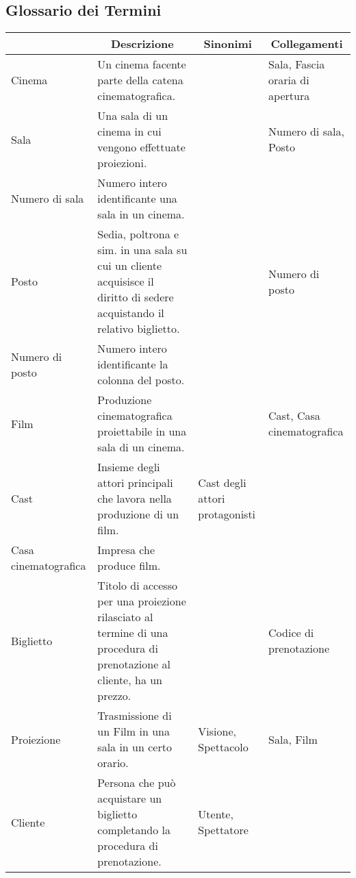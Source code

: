\subsection*{Glossario dei Termini}
%
%
\begin{longtable}{|p{3.86cm}|p{3.86cm}|p{3.86cm}|p{3.86cm}|}
    \hline
    \rowcolor{tblhdrcolor}
    \multicolumn{1}{|c|}{\textbf{Termine}}
     & \multicolumn{1}{|c|}{\textbf{Descrizione}}
     & \multicolumn{1}{|c|}{\textbf{Sinonimi}}
     & \multicolumn{1}{|c|}{\textbf{Collegamenti}}
    \\\hline
    Cinema
     & Un cinema facente parte della catena cinematografica.
     &
     & Sala, Fascia oraria di apertura
    \\\hline
    Sala
     & Una sala di un cinema in cui vengono effettuate proiezioni.
     &
     & Numero di sala, Posto
    \\\hline
    Numero di sala
     & Numero intero identificante una sala in un cinema.
     &
     &
    \\\hline
    Posto
     & Sedia, poltrona e sim. in una sala su cui un cliente acquisisce
    il diritto di sedere acquistando il relativo biglietto.
     &
     & Numero di posto
    \\\hline
    Numero di posto
     & Numero intero identificante la colonna del posto.
     &
     &
    \\\hline
    Film
     & Produzione cinematografica proiettabile in una sala di un cinema.
     &
     & Cast, Casa cinematografica
    \\\hline
    Cast
     & Insieme degli attori principali che lavora nella produzione di un film.
     & Cast degli attori protagonisti
     &
    \\\hline
    Casa cinematografica
     & Impresa che produce film.
     &
     &
    \\ \hline
    Biglietto
     & Titolo di accesso per una proiezione rilasciato al termine di una
    procedura di prenotazione al cliente, ha un prezzo.
     &
     & Codice di prenotazione
    \\ \hline
    Proiezione
     & Trasmissione di un Film in una sala in un certo orario.
     & Visione, Spettacolo
     & Sala, Film
    \\ \hline
    Cliente
     & Persona che può acquistare un biglietto completando la procedura di
    prenotazione.
     & Utente, Spettatore
     &
    \\ \hline

\end{longtable}
